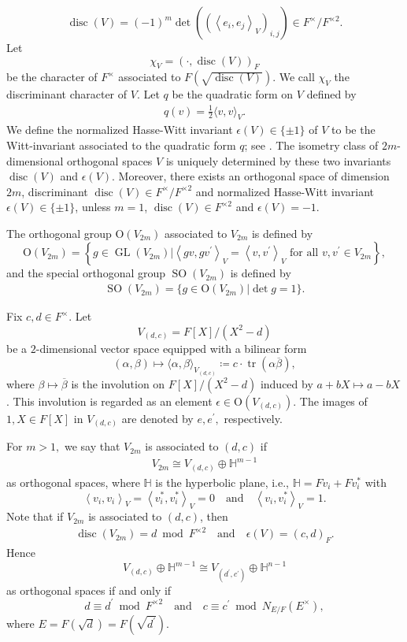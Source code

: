 \documentclass[article]{article}
\numberwithin{equation}{section}
\theoremstyle{definition}
\DeclareMathOperator{\GL}{GL}
\DeclareMathOperator{\SO}{SO}
\DeclareMathOperator{\disc}{disc}
\begin{document}
$$\disc(V)=(-1)^{m} \det ((\left\langle e_{i}, e_{j}\right\rangle_{V})_{i, j})  \in F^{ \times} / F^{ \times 2}.$$
Let $$\chi_{V}=(\cdot, \disc(V))_F$$ be the character of $F^{\times}$ associated to $F(\sqrt{\disc(V)})$. We call $\chi_{V}$ the discriminant character of $V$. Let $q$ be the quadratic form on $V$ defined by 
\begin{align*}
q(v)=\frac{1}{2}\langle v, v\rangle_{V}.
\end{align*}
We define the normalized Hasse-Witt invariant $\epsilon(V)\in \{\pm 1\}$ of $V$ to be the Witt-invariant associated to the quadratic form $q$; see \cite[pp.80-81]{MR770063}. The isometry class of $2m$-dimensional orthogonal spaces $V$ is uniquely determined by these two invariants $\disc(V)$ and $\epsilon(V)$. Moreover, there exists an orthogonal space of dimension $2m$, discriminant $\disc(V)\in  F^{\times}/F^{\times 2}$ and normalized Hasse-Witt invariant $\epsilon(V)\in \{\pm 1\}$, unless $m=1$,  $\disc(V)\in F^{\times 2}$ and $\epsilon(V)= -1$.

The orthogonal group $\mathrm{O}(V_{2m})$ associated to $V_{2m}$ is defined by $$\mathrm{O}(V_{2m})=\left\{g \in \GL(V_{2m}) |\left\langle g v, g v^{\prime}\right\rangle_{V}=\left\langle v, v^{\prime}\right\rangle_{V} \text { for all } v, v^{\prime} \in V_{2m}\right\},$$
and the special orthogonal group $\SO(V_{2m})$ is defined by 
\begin{align*}
\SO(V_{2m})=\{g\in \mathrm O(V_{2m})|\det g=1\}.
\end{align*}

Fix $c, d \in F^{ \times}$. Let 
$$V_{(d, c)}=F[X] /(X^{2}-d)$$
be a $2$-dimensional vector space equipped with a bilinear form
$$(\alpha, \beta) \mapsto\langle\alpha, \beta\rangle_{V_{(d, c)}} \coloneqq c \cdot \operatorname{tr}(\alpha \overline{\beta}),$$
where $\beta \mapsto \overline{\beta}$ is the involution on $F[X] /\left(X^{2}-d\right)$ induced by $a+b X \mapsto a-b X$. This involution is regarded as an element $\epsilon \in \mathrm O\left(V_{(d, c)}\right)$. The images of $1, X \in F[X]$ in $V_{(d, c)}$ are denoted by $e, e^{\prime},$ respectively.

For $m>1,$ we say that $V_{2m}$ is associated to $(d, c)$ if
\begin{align}\label{127}
V_{2m} \cong V_{(d,c)} \oplus \mathbb{H}^{m-1}
\end{align}
as orthogonal spaces, where $\mathbb{H}$ is the hyperbolic plane, i.e., $\mathbb{H}=F v_{i}+F v_{i}^{*}$ with
$$\left\langle v_{i}, v_{i}\right\rangle_{V}=\left\langle v_{i}^{*}, v_{i}^{*}\right\rangle_{V}=0\quad \mbox{and}\quad  \left\langle v_{i}, v_{i}^{*}\right\rangle_{V}= 1. $$  
Note that if $V_{2m}$ is associated to $(d,c)$, then 
\begin{align*}
\disc (V_{2m})= d \bmod F^{\times 2}\quad\mbox{and}\quad \epsilon(V)=(c,d)_{F}.
\end{align*}
Hence $$V_{(d, c)} \oplus 
\mathbb{H}^{m-1} \cong V_{\left(d^{\prime}, c^{\prime}\right)} \oplus \mathbb{H}^{n-1}$$
as orthogonal spaces if and only if 
$$d \equiv d^{\prime} \bmod F^{\times 2}\quad \mbox{and}\quad c \equiv c^{\prime} \bmod N_{E / F}\left(E^{ \times}\right),$$ 
where $E= F(\sqrt{d})=F(\sqrt{d^{\prime}})$. 
\end{document}
